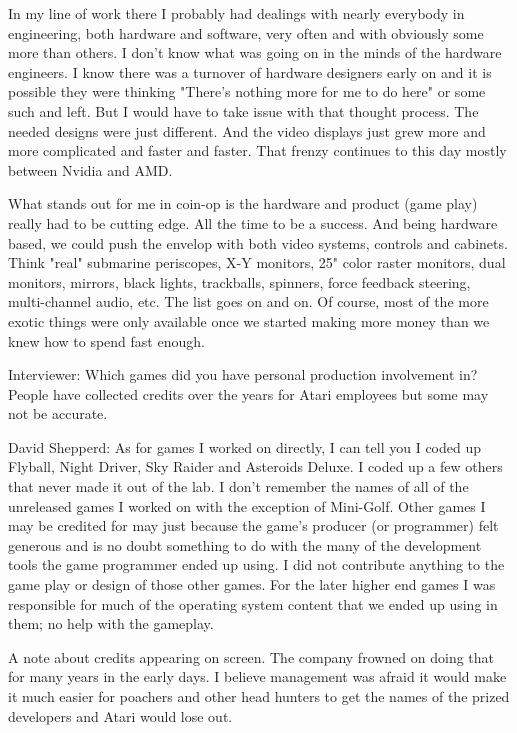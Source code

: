 In my line of work there I probably had dealings with nearly everybody in engineering, both hardware and software, very often and with obviously some more than others. I don't know what was going on in the minds of the hardware engineers. I know there was a turnover of hardware designers early on and it is possible they were thinking "There's nothing more for me to do here" or some such and left. But I would have to take issue with that thought process. The needed designs were just different. And the video displays just grew more and more complicated and faster and faster. That frenzy continues to this day mostly between Nvidia and AMD.

What stands out for me in coin-op is the hardware and product (game play) really had to be cutting edge. All the time to be a success. And being hardware based, we could push the envelop with both video systems, controls and cabinets. Think "real" submarine periscopes, X-Y monitors, 25" color raster monitors, dual monitors, mirrors, black lights, trackballs, spinners, force feedback steering, multi-channel audio, etc. The list goes on and on. Of course, most of the more exotic things were only available once we started making more money than we knew how to spend fast enough.

\textcolor{interviewer}{Interviewer:} Which games did you have personal production involvement in? People have collected credits over the years for Atari employees but some may not be accurate.

\textcolor{interviewee}{David Shepperd:} As for games I worked on directly, I can tell you I coded up Flyball, Night Driver, Sky Raider and Asteroids Deluxe. I coded up a few others that never made it out of the lab. I don't remember the names of all of the unreleased games I worked on with the exception of Mini-Golf. Other games I may be credited for may just because the game's producer (or programmer) felt generous and is no doubt something to do with the many of the development tools the game programmer ended up using. I did not contribute anything to the game play or design of those other games. For the later higher end games I was responsible for much of the operating system content that we ended up using in them; no help with the gameplay.

A note about credits appearing on screen. The company frowned on doing that for many years in the early days. I believe management was afraid it would make it much easier for poachers and other head hunters to get the names of the prized developers and Atari would lose out. 

